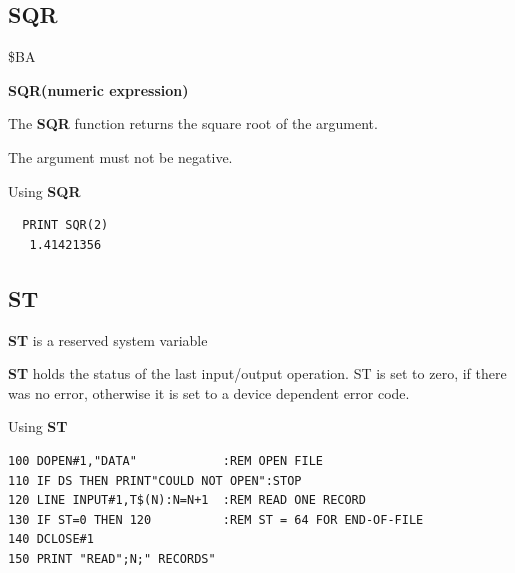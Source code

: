 \subsection{SQR}
\begin{description}[leftmargin=2cm,style=nextline]
\item [Token:] \$BA
\item [Format:] {\bf SQR(numeric expression)}
\item [Usage:] The {\bf SQR} function returns the square root
               of the argument.

\item [Remarks:] The argument must not be negative.
\item [Example:] Using {\bf SQR}
\begin{tcolorbox}[colback=black,coltext=white]
\verbatimfont{\codefont}
\begin{verbatim}
  PRINT SQR(2)
   1.41421356
\end{verbatim}
\end{tcolorbox}
\end{description}


\newpage
\subsection{ST}
\begin{description}[leftmargin=2cm,style=nextline]
\item [Format:] {\bf ST} is a reserved system variable
\item [Usage:]  {\bf ST} holds the status of the last input/output operation.
                ST is set to zero, if there was no error, otherwise
                it is set to a device dependent error code.

\item [Example:] Using {\bf ST}
\begin{tcolorbox}[colback=black,coltext=white]
\verbatimfont{\codefont}
\begin{verbatim}
100 DOPEN#1,"DATA"            :REM OPEN FILE
110 IF DS THEN PRINT"COULD NOT OPEN":STOP
120 LINE INPUT#1,T$(N):N=N+1  :REM READ ONE RECORD
130 IF ST=0 THEN 120          :REM ST = 64 FOR END-OF-FILE
140 DCLOSE#1
150 PRINT "READ";N;" RECORDS"
\end{verbatim}
\end{tcolorbox}
\end{description}

